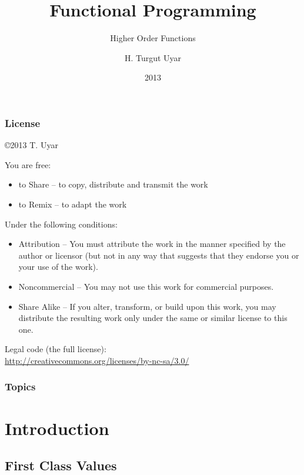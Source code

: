 \documentclass[dvipsnames]{beamer}
\title{Functional Programming}
\subtitle{Higher Order Functions}
\author{H. Turgut Uyar}
\date{2013}
\theoremstyle{plain}
\begin{document}
\begin{frame}
  \titlepage
\end{frame}

\begin{frame}
  \frametitle{License}

  \hfill
  \copyright 2013 T. Uyar

  \vfill
  \begin{tiny}
    You are free:
    \begin{itemize}
      \item to Share -- to copy, distribute and transmit the work
      \item to Remix -- to adapt the work
    \end{itemize}

    Under the following conditions:
    \begin{itemize}
      \item Attribution -- You must attribute the work in the manner specified by
        the author or licensor (but not in any way that suggests that they
        endorse you or your use of the work).

      \item Noncommercial -- You may not use this work for commercial purposes.

      \item Share Alike -- If you alter, transform, or build upon this work, you
        may distribute the resulting work only under the same or similar license
        to this one.
    \end{itemize}
  \end{tiny}

  \vfill
  Legal code (the full license):\\
  \url{http://creativecommons.org/licenses/by-nc-sa/3.0/}
\end{frame}

\begin{frame}
  \frametitle{Topics}
  \tableofcontents
\end{frame}

\section{Introduction}

\subsection{First Class Values}
\end{document}
